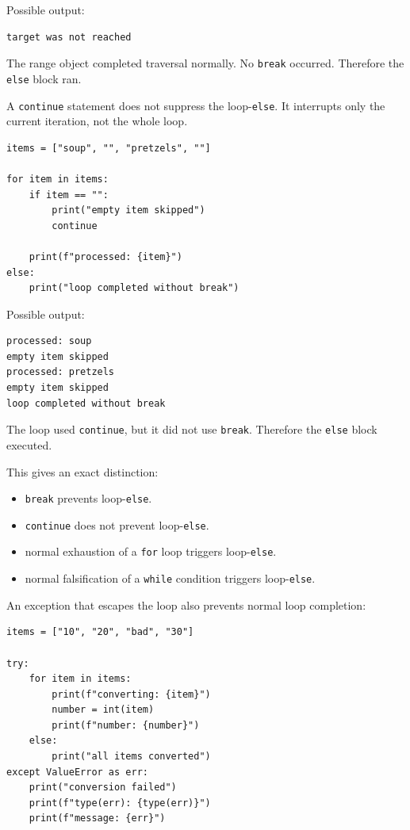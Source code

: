 Possible output:

\begin{verbatim}
target was not reached
\end{verbatim}

The range object completed traversal normally. No \texttt{break} occurred. Therefore the \texttt{else} block ran.

A \texttt{continue} statement does not suppress the loop-\texttt{else}. It interrupts only the current iteration, not the whole loop.

\begin{verbatim}
items = ["soup", "", "pretzels", ""]

for item in items:
    if item == "":
        print("empty item skipped")
        continue

    print(f"processed: {item}")
else:
    print("loop completed without break")
\end{verbatim}

Possible output:

\begin{verbatim}
processed: soup
empty item skipped
processed: pretzels
empty item skipped
loop completed without break
\end{verbatim}

The loop used \texttt{continue}, but it did not use \texttt{break}. Therefore the \texttt{else} block executed.

This gives an exact distinction:

\begin{itemize}
    \item \texttt{break} prevents loop-\texttt{else}.
    \item \texttt{continue} does not prevent loop-\texttt{else}.
    \item normal exhaustion of a \texttt{for} loop triggers loop-\texttt{else}.
    \item normal falsification of a \texttt{while} condition triggers loop-\texttt{else}.
\end{itemize}

An exception that escapes the loop also prevents normal loop completion:

\begin{verbatim}
items = ["10", "20", "bad", "30"]

try:
    for item in items:
        print(f"converting: {item}")
        number = int(item)
        print(f"number: {number}")
    else:
        print("all items converted")
except ValueError as err:
    print("conversion failed")
    print(f"type(err): {type(err)}")
    print(f"message: {err}")
\end{verbatim}

